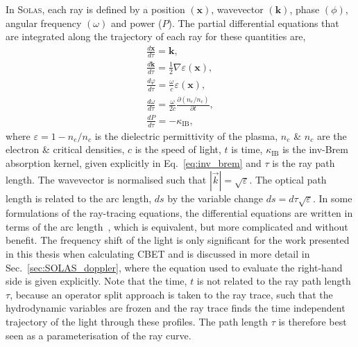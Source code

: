 In \textsc{Solas}, each ray is defined by a position $(\mathbf{x})$, wavevector $(\mathbf{k})$, phase $(\phi)$, angular frequency $(\omega)$ and power ($P$).
The partial differential equations that are integrated along the trajectory of each ray for these quantities are,
\begin{equation}
    \label{eq:SOLAS_rays}
    \begin{gathered}
        \frac{d \mathbf{x}}{d \tau}=\mathbf{k}, \\
        \frac{d \mathbf{k}}{d \tau}=\frac{1}{2} \nabla \varepsilon(\mathbf{x}), \\
        \frac{d \varphi}{d \tau}=\frac{\omega}{c} \varepsilon(\mathbf{x}), \\
        \frac{d \omega}{d \tau}=\frac{\omega}{2 c} \frac{\partial\left(n_e / n_c\right)}{\partial t}, \\
        \frac{d P}{d \tau}=-\kappa_{\text{IB}},
    \end{gathered}
\end{equation}
where $\varepsilon=1-n_e/n_c$ is the dielectric permittivity of the plasma, $n_e$ \& $n_c$ are the electron \& critical densities, $c$ is the speed of light, $t$ is time, $\kappa_{\text{IB}}$ is the \ac{inv-Brem} absorption kernel, given explicitly in Eq.~\ref{eq:inv_brem} and $\tau$ is the ray path length.
The wavevector is normalised such that $|\vec{k}|=\sqrt{\varepsilon}$.
The optical path length is related to the arc length, $ds$ by the variable change $ds=d\tau\sqrt{\varepsilon}$.
In some formulations of the ray-tracing equations, the differential equations are written in terms of the arc length~\cite{marozas_wavelength-detuning_2018,kaiser_laser_2000}, which is equivalent, but more complicated and without benefit.
The frequency shift of the light is only significant for the work presented in this thesis when calculating \ac{CBET} and is discussed in more detail in Sec.~\ref{sec:SOLAS_doppler}, where the equation used to evaluate the right-hand side is given explicitly.
Note that the time, $t$ is not related to the ray path length $\tau$, because an operator split approach is taken to the ray trace, such that the hydrodynamic variables are frozen and the ray trace finds the time independent trajectory of the light through these profiles.
The path length $\tau$ is therefore best seen as a parameterisation of the ray curve.

